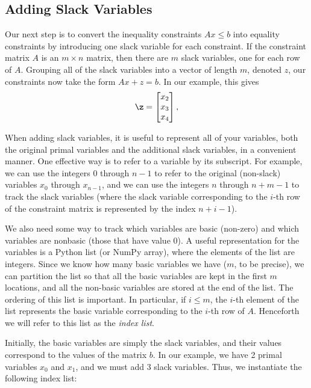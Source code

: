 \subsection*{Adding Slack Variables} %

Our next step is to convert the inequality constraints $Ax \leq b$ into equality constraints
by introducing one slack variable for each constraint.
If the constraint matrix $A$ is an $m \times n$ matrix, then there are $m$ slack variables,
one for each row of $A$.
Grouping all of the slack variables into a vector of length $m$, denoted $z$, our
constraints now take the form $Ax + z = b$.
In our example, this gives
\[
\z = \begin{bmatrix}
 x_2 \\
 x_3 \\
 x_4
\end{bmatrix},
\]

When adding slack variables, it is useful to represent all of your variables, both the original primal variables and
the additional slack variables, in a convenient manner.
One effective way is to refer to a variable by its subscript.
For example, we can use the integers $0$ through $n-1$ to refer to the original (non-slack) variables $x_0$ through
$x_{n-1}$, and we can use the integers $n$ through $n+m-1$ to track the slack variables (where the slack variable
corresponding to the $i$-th row of the constraint matrix is represented by the index $n+i-1$).

We also need some way to track which variables are basic (non-zero) and which variables are nonbasic (those that have value $0$).
A useful representation for the variables is a Python list (or NumPy array), where the elements of the list are integers.
Since we know how many basic variables we have ($m$, to be precise), we can partition the list so that all the basic
variables are kept in the first $m$ locations, and all the non-basic variables are stored at the end of the list.
The ordering of this list is important. In particular, if $i \leq m$, the $i$-th element of the list represents
the basic variable corresponding to the $i$-th row of $A$. Henceforth we will refer to this list as the \emph{index list}.

Initially, the basic variables are simply the slack variables, and their values correspond to the values of the matrix $b$.
In our example, we have 2 primal variables $x_0$ and $x_1$, and we must add 3 slack variables.
Thus, we instantiate the following index list:


